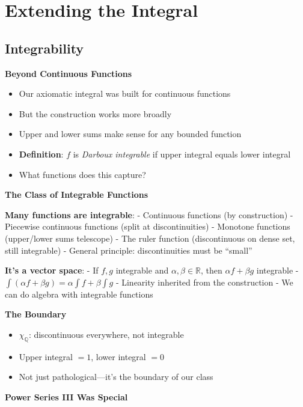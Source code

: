 \documentclass[
  10pt,
  letterpaper,
]{scrbook}
\providecommand{\tightlist}{%
  \setlength{\itemsep}{0pt}\setlength{\parskip}{0pt}}
\begin{document}
\chapter{Extending the Integral}\label{extending-the-integral}

\section{Integrability}\label{integrability}

\textbf{Beyond Continuous Functions}

\begin{itemize}
\tightlist
\item
  Our axiomatic integral was built for continuous functions
\item
  But the construction works more broadly
\item
  Upper and lower sums make sense for any bounded function
\item
  \textbf{Definition}: \(f\) is \emph{Darboux integrable} if upper
  integral equals lower integral
\item
  What functions does this capture?
\end{itemize}

\textbf{The Class of Integrable Functions}

\textbf{Many functions are integrable}: - Continuous functions (by
construction) - Piecewise continuous functions (split at
discontinuities) - Monotone functions (upper/lower sums telescope) - The
ruler function (discontinuous on dense set, still integrable) - General
principle: discontinuities must be ``small''

\textbf{It's a vector space}: - If \(f, g\) integrable and
\(\alpha, \beta \in \mathbb{R}\), then \(\alpha f + \beta g\) integrable
- \(\int(\alpha f + \beta g) = \alpha \int f + \beta \int g\) -
Linearity inherited from the construction - We can do algebra with
integrable functions

\textbf{The Boundary}

\begin{itemize}
\tightlist
\item
  \(\chi_{\mathbb{Q}}\): discontinuous everywhere, not integrable
\item
  Upper integral \(= 1\), lower integral \(= 0\)
\item
  Not just pathological---it's the boundary of our class
\end{itemize}

\textbf{Power Series III Was Special}
\end{document}
